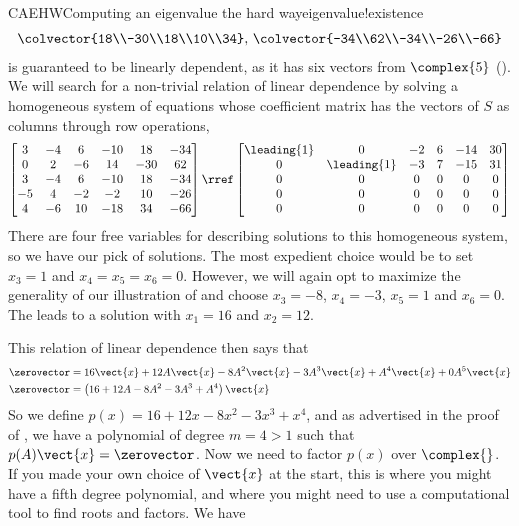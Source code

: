 \begin{example}{CAEHW}{Computing an eigenvalue the hard way}{eigenvalue!existence}
\begin{align*}
{\colvector{18\\-30\\18\\10\\34},\,
\colvector{-34\\62\\-34\\-26\\-66}
}
\end{align*}
%
is guaranteed to be linearly dependent, as it has six vectors from $\complex{5}$ ().  We will search for a non-trivial relation of linear dependence by solving a homogeneous system of equations whose coefficient matrix has the vectors of $S$ as columns through row operations,
%
\begin{equation*}
\begin{bmatrix}
3 & -4 & 6 & -10 & 18 & -34\\ 
0 & 2 & -6 & 14 & -30 & 62\\ 
3 & -4 & 6 & -10 & 18 & -34\\ 
-5 & 4 & -2 & -2 & 10 & -26\\ 
4 & -6 & 10 & -18 & 34 & -66
\end{bmatrix}
\rref
\begin{bmatrix}
\leading{1} & 0 & -2 & 6 & -14 & 30\\ 
0 & \leading{1} & -3 & 7 & -15 & 31\\ 
0 & 0 & 0 & 0 & 0 & 0\\ 
0 & 0 & 0 & 0 & 0 & 0\\ 
0 & 0 & 0 & 0 & 0 & 0
\end{bmatrix}
\end{equation*}
%
There are four free variables for describing solutions to this homogeneous system, so we have our pick of solutions.  The most expedient choice would be to set $x_3=1$ and $x_4=x_5=x_6=0$.  However, we will again opt to maximize the generality of our illustration of  and choose $x_3=-8$, $x_4=-3$, $x_5=1$ and $x_6=0$.  The leads to a solution with $x_1=16$ and $x_2=12$.\par
%
This relation of linear dependence then says that 
%
\begin{align*}
\zerovector&=16\vect{x}+12A\vect{x}-8A^2\vect{x}-3A^3\vect{x}+A^4\vect{x}+0A^5\vect{x}\\
\zerovector&=\left(16+12A-8A^2-3A^3+A^4\right)\vect{x}
\end{align*}
%
So we define $p(x)=16+12x-8x^2-3x^3+x^4$, and as advertised in the proof of , we have a polynomial of degree $m=4>1$ such that $p(A)\vect{x}=\zerovector$.  Now we need to factor $p(x)$ over $\complex{\null}$.  If you made your own choice of $\vect{x}$ at the start, this is where you might have a fifth degree polynomial, and where you might need to use a computational tool to find roots and factors.  We have

\end{example}
